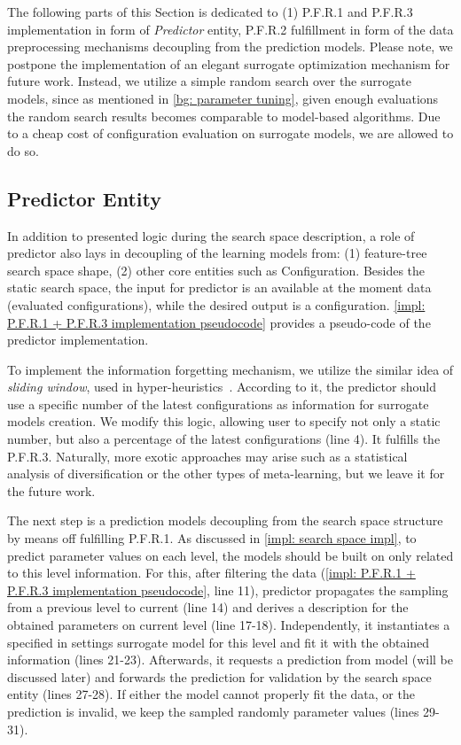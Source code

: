 The following parts of this Section is dedicated to (1) P.F.R.1 and P.F.R.3 implementation in form of \emph{Predictor} entity, P.F.R.2 fulfillment in form of the data preprocessing mechanisms decoupling from the prediction models. Please note, we postpone the implementation of an elegant surrogate optimization mechanism for future work. Instead, we utilize a simple random search over the surrogate models, since as mentioned in \cref{bg: parameter tuning}, given enough evaluations the random search results becomes comparable to model-based algorithms. Due to a cheap cost of configuration evaluation on surrogate models, we are allowed to do so.

\subsection{Predictor Entity}
In addition to presented logic during the search space description, a role of predictor also lays in decoupling of the learning models from: (1) feature-tree search space shape, (2) other core entities such as Configuration. Besides the static search space, the input for predictor is an available at the moment data (evaluated configurations), while the desired output is a configuration. \cref{impl: P.F.R.1 + P.F.R.3 implementation pseudocode} provides a pseudo-code of the predictor implementation.

To implement the information forgetting mechanism, we utilize the similar idea of \emph{sliding window}, used in hyper-heuristics~\cite{ferreira2017multi}. According to it, the predictor should use a specific number of the latest configurations as information for surrogate models creation. We modify this logic, allowing user to specify not only a static number, but also a percentage of the latest configurations (line 4). It fulfills the P.F.R.3. Naturally, more exotic approaches may arise such as a statistical analysis of diversification or the other types of meta-learning, but we leave it for the future work.

The next step is a prediction models decoupling from the search space structure by means off fulfilling P.F.R.1. As discussed in \cref{impl: search space impl}, to predict parameter values on each level, the models should be built on only related to this level information. For this, after filtering the data (\cref{impl: P.F.R.1 + P.F.R.3 implementation pseudocode}, line 11), predictor propagates the sampling from a previous level to current (line 14) and derives a description for the obtained parameters on current level (line 17-18). Independently, it instantiates a specified in settings surrogate model for this level and fit it with the obtained information (lines 21-23). Afterwards, it requests a prediction from model (will be discussed later) and forwards the prediction for validation by the search space entity (lines 27-28). If either the model cannot properly fit the data, or the prediction is invalid, we keep the sampled randomly parameter values (lines 29-31).

